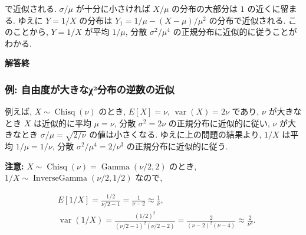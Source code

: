 \documentclass[
  letterpaper,
  DIV=11,
  numbers=noendperiod]{scrartcl}
\begin{document}
で近似される. \(\sigma/\mu\) が十分に小さければ \(X/\mu\)
の分布の大部分は \(1\) の近くに留まる. ゆえに \(Y=1/X\) の分布は
\(Y_1 = 1/\mu - (X-\mu)/\mu^2\) の分布で近似される. このことから,
\(Y=1/X\) が平均 \(1/\mu\), 分散 \(\sigma^2/\mu^4\)
の正規分布に近似的に従うことがわかる.

\textbf{解答終}

\hypertarget{ux4f8b-ux81eaux7531ux5ea6ux304cux5927ux304dux306aux3c7uxb2ux5206ux5e03ux306eux9006ux6570ux306eux8fd1ux4f3c}{%
\subsubsection{例:
自由度が大きなχ²分布の逆数の近似}\label{ux4f8b-ux81eaux7531ux5ea6ux304cux5927ux304dux306aux3c7uxb2ux5206ux5e03ux306eux9006ux6570ux306eux8fd1ux4f3c}}

例えば, \(X \sim \operatorname{Chisq}(\nu)\) のとき, \(E[X]=\nu\),
\(\operatorname{var}(X)=2\nu\) であり, \(\nu\) が大きなとき \(X\)
は近似的に平均 \(\mu=\nu\), 分散 \(\sigma^2=2\nu\)
の正規分布に近似的に従い, \(\nu\) が大きなとき
\(\sigma/\mu = \sqrt{2/\nu}\) の値は小さくなる.
ゆえに上の問題の結果より, \(1/X\) は平均 \(1/\mu = 1/\nu\), 分散
\(\sigma^2/\mu^4 = 2/\nu^3\) の正規分布に近似的に従う.

\textbf{注意:}
\(X\sim\operatorname{Chisq}(\nu) = \operatorname{Gamma}(\nu/2, 2)\)
のとき, \(1/X\sim\operatorname{InverseGamma}(\nu/2, 1/2)\) なので,

\[
\begin{aligned}
&
E[1/X] = \frac{1/2}{\nu/2-1} = \frac{1}{\nu-2} \approx \frac{1}{\nu},
\\ &
\operatorname{var}(1/X) = \frac{(1/2)^2}{(\nu/2-1)^2(\nu/2-2)} =
\frac{2}{(\nu-2)^2(\nu-4)} \approx \frac{2}{\nu^3}.
\end{aligned}
\]
\end{document}
